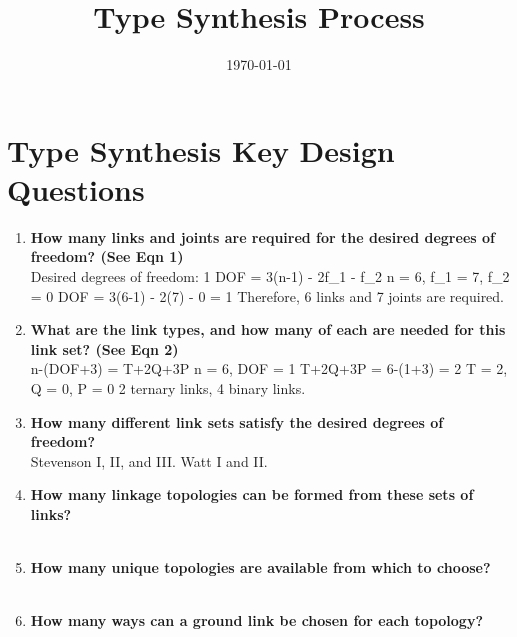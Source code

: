 \documentclass[11pt]{article}
\title{Type Synthesis Process}
\date{\today}
\begin{document}
\maketitle

\section*{Type Synthesis Key Design Questions}

\begin{enumerate}[leftmargin=*, label=\textbf{\arabic*.}]
  \item \textbf{How many links and joints are required for the desired degrees of freedom? (See Eqn 1)}\\[0.25em]
  Desired degrees of freedom: 1
  DOF = 3(n-1) - 2f_1 - f_2
  n = 6, f_1 = 7, f_2 = 0
  DOF = 3(6-1) - 2(7) - 0 = 1
  Therefore, 6 links and 7 joints are required.
  \\\vspace{0.75em}

  \item \textbf{What are the link types, and how many of each are needed for this link set? (See Eqn 2)}\\[0.25em]
  n-(DOF+3) = T+2Q+3P
  n = 6, DOF = 1
  T+2Q+3P = 6-(1+3) = 2
  T = 2, Q = 0, P = 0
  2 ternary links, 4 binary links.
  \\\vspace{0.75em}

  \item \textbf{How many different link sets satisfy the desired degrees of freedom?}\\[0.25em]
  Stevenson I, II, and III. Watt I and II.
  \\\vspace{0.75em}

  \item \textbf{How many linkage topologies can be formed from these sets of links?}\\[0.25em]
  \\\vspace{0.75em}

  \item \textbf{How many unique topologies are available from which to choose?}\\[0.25em]
  \\\vspace{0.75em}

  \item \textbf{How many ways can a ground link be chosen for each topology?}\\[0.25em]
  \\\vspace{0.75em}


\end{enumerate}
\end{document}
